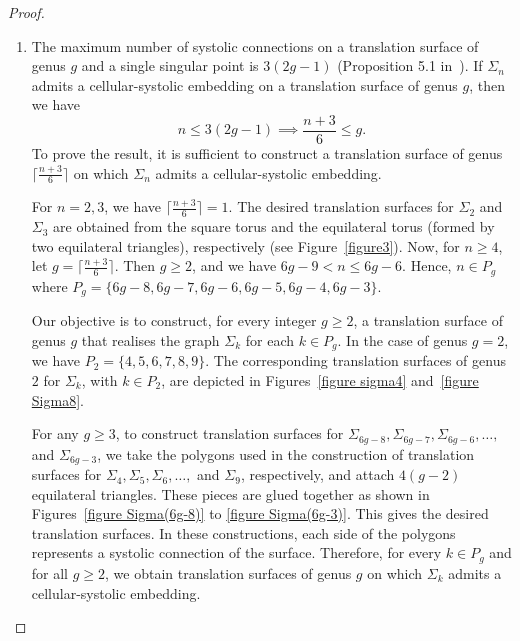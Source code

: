 \documentclass[11pt]{amsart}
\theoremstyle{plain}
\theoremstyle{definition}
\theoremstyle{remark}
\numberwithin{equation}{section}
\numberwithin{figure}{section}
\begin{document}
\begin{proof}
\begin{enumerate}
\item The maximum number of systolic connections on a translation surface of genus $g$ and a single singular point is $3(2g-1)$ (Proposition 5.1 in~\cite{Bo21}).  If $\Sigma_n$ admits a cellular-systolic embedding on a translation surface of genus $g$, then we have $$ n \leq 3(2g - 1)  \implies \frac{n + 3}{6}\leq g.$$ To prove the result, it is sufficient to construct a translation surface of genus $\lceil \frac{n + 3}{6} \rceil$ on which $\Sigma_n$ admits a cellular-systolic embedding. 

For $n = 2, 3$, we have $\lceil \frac{n + 3}{6} \rceil = 1$. The desired translation surfaces for $\Sigma_2$ and $\Sigma_3$ are obtained from the square torus and the equilateral torus (formed by two equilateral triangles), respectively (see Figure~\ref{figure3}). Now, for $n \geq 4$, let $g = \lceil \frac{n + 3}{6} \rceil$. Then $g \geq 2$, and we have $6g - 9 < n \leq 6g - 6.$
Hence, $n \in P_g$ where $P_g = \{6g - 8, 6g - 7, 6g - 6, 6g - 5, 6g - 4, 6g - 3\}.$

Our objective is to construct, for every integer $g \geq 2$, a translation surface of genus $g$ that realises the graph $\Sigma_k$ for each $k \in P_g$.  
In the case of genus $g = 2$, we have $P_2 = \{4, 5, 6, 7, 8, 9\}$. The corresponding translation surfaces of genus $2$ for $\Sigma_k$, with $k \in P_2$, are depicted in Figures~\ref{figure sigma4} and~\ref{figure Sigma8}.  



For any $g\geq 3$, to construct translation surfaces for $\Sigma_{6g - 8}, \Sigma_{6g - 7}, \Sigma_{6g - 6}, \dots,$ and $ \Sigma_{6g - 3}$, we take the polygons used in the construction of translation surfaces for $\Sigma_4, \Sigma_5, \Sigma_6, \dots,$ and $\Sigma_9$, respectively, and attach $4(g - 2)$ equilateral triangles. These pieces are glued together as shown in Figures~\ref{figure Sigma(6g-8)} to \ref{figure Sigma(6g-3)}. This gives the desired translation surfaces.
In these constructions, each side of the polygons represents a systolic connection of the surface.
Therefore, for every $k \in P_g$ and for all $g \geq 2$, we obtain translation surfaces of genus $g$ on which $\Sigma_k$ admits a cellular-systolic embedding. %


\begin{figure}[htbp]
\begin{center}
\end{center}
\end{figure}
\end{enumerate}
\end{proof}
\end{document}
